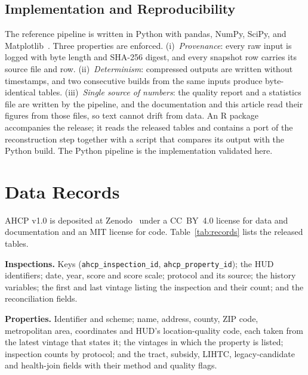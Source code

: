 \documentclass[10pt,twocolumn,letterpaper]{article}
\newcommand{\runhead}[1]{\par\vspace{0.35ex}\noindent\textbf{#1}\hspace{0.35em}}
\newcommand{\col}[1]{\texttt{\small #1}}
\begin{document}
\subsection{Implementation and Reproducibility}
The reference pipeline is written in Python with pandas, NumPy, SciPy, and Matplotlib~\cite{mckinney2010,harris2020,virtanen2020,hunter2007}. Three properties are enforced. (i)~\emph{Provenance}: every raw input is logged with byte length and SHA-256 digest, and every snapshot row carries its source file and row. (ii)~\emph{Determinism}: compressed outputs are written without timestamps, and two consecutive builds from the same inputs produce byte-identical tables. (iii)~\emph{Single source of numbers}: the quality report and a statistics file are written by the pipeline, and the documentation and this article read their figures from those files, so text cannot drift from data. An R package accompanies the release; it reads the released tables and contains a port of the reconstruction step together with a script that compares its output with the Python build. The Python pipeline is the implementation validated here.

\section{Data Records}\label{sec:records}
AHCP v1.0 is deposited at Zenodo~\cite{ahcp} under a CC~BY~4.0 license for data and documentation and an MIT license for code. Table~\ref{tab:records} lists the released tables.

\begin{table}[t]
\caption{Released tables. File names carry the prefix \texttt{ahcp\_}.}\label{tab:records}
\centering\scriptsize\setlength{\tabcolsep}{3.5pt}

\end{table}

\runhead{Inspections.} Keys (\col{ahcp\_inspection\_id}, \col{ahcp\_property\_id}); the HUD identifiers; date, year, score and score scale; protocol and its source; the history variables; the first and last vintage listing the inspection and their count; and the reconciliation fields.

\runhead{Properties.} Identifier and scheme; name, address, county, ZIP code, metropolitan area, coordinates and HUD's location-quality code, each taken from the latest vintage that states it; the vintages in which the property is listed; inspection counts by protocol; and the tract, subsidy, LIHTC, legacy-candidate and health-join fields with their method and quality flags.
\end{document}
